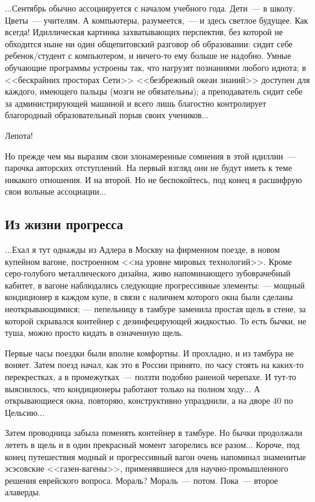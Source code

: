 \documentclass{scrbook}
\newcommand{\flqq}{<<}
\newcommand{\frqq}{>>}
\newcommand{\mdash}{~--- }
\newcommand{\enummdash}{--- } %
\newcommand{\commamdash}{~--- } %
\newcommand{\essaysection}[1]{\subsection*{#1}\nopagebreak}
\begin{document}
...Сентябрь обычно ассоциируется с началом учебного года. Дети{\mdash}в школу. Цветы{\mdash}учителям. А компьютеры, разумеется,{\commamdash}и здесь светлое будущее. Как всегда! Идиллическая картинка захватывающих перспектив, без которой не обходится ныне ни один общепитовский разговор об образовании: сидит себе ребенок/студент с компьютером, и ничего-то ему больше не надобно. Умные обучающие программы устроены так, что нагрузят познаниями любого идиота; в {\flqq}бескрайних просторах Сети{\frqq} {\flqq}безбрежный океан знаний{\frqq} доступен для каждого, имеющего пальцы (мозги не обязательны); а преподаватель сидит себе за администрирующей машиной и всего лишь благостно контролирует благородный образовательный порыв своих учеников...

Лепота!

Но прежде чем мы выразим свои злонамеренные сомнения в этой идиллии{\mdash}парочка авторских отступлений. На первый взгляд они не будут иметь к теме никакого отношения. И на второй. Но не беспокойтесь, под конец я расшифрую свои вольные ассоциации...

\essaysection{Из жизни прогресса}

...Ехал я тут однажды из Адлера в Москву на фирменном поезде, в новом купейном вагоне, построенном {\flqq}на уровне мировых технологий{\frqq}. Кроме серо-голубого металлического дизайна, живо напоминающего зубоврачебный кабитет, в вагоне наблюдались следующие прогрессивные элементы:
{\enummdash}мощный кондиционер в каждом купе, в связи с наличием которого окна были сделаны неоткрывающимися;
{\enummdash}пепельницу в тамбуре заменила простая щель в стене, за которой скрывался контейнер с дезинфецирующей жидкостью. То есть бычки, не туша, можно просто кидать в означенную щель.

Первые часы поездки были вполне комфортны. И прохладно, и из тамбура не воняет. Затем поезд начал, как это в России принято, по часу стоять на каких-то перекрестках, а в промежутках{\mdash}ползти подобно раненой черепахе. И тут-то выяснилось, что кондиционеры работают только на полном ходу... А открывающиеся окна, повторяю, конструктивно упразднили, а на дворе 40 по Цельсию...

Затем проводница забыла поменять контейнер в тамбуре. Но бычки продолжали лететь в щель и в один прекрасный момент загорелись все разом... Короче, под конец путешествия модный и прогрессивный вагон очень напоминал знаменитые эсэсовские {\flqq}газен-вагены{\frqq}, применявшиеся для научно-промышленного решения еврейского вопроса.
Мораль? Мораль{\mdash}потом. Пока{\mdash}второе алаверды.
\end{document}
